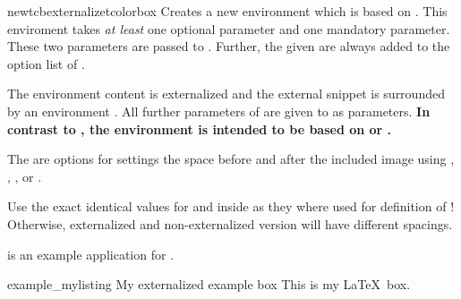 \begin{docCommand}[doc new=2015-03-11]{newtcbexternalizetcolorbox}{}
  Creates a new environment  which is based on
  . This enviroment takes \emph{at least}
  one optional parameter and one mandatory parameter.
  These two parameters are passed to .
  Further, the given  are always added to the option list of .\par
  The environment content is externalized and the external snippet is surrounded
  by an environment . All further parameters of 
  are given to  as parameters.
  \textbf{In contrast to , the
  environment  is intended to be based on 
  or .}\par
  The  are options for settings the space before
  and after the included image using , ,
  , or .
  \begin{marker}
  Use the exact identical values for  and 
  inside  as they where used for definition of
  ! Otherwise, externalized and non-externalized version will have
  different spacings.
  \end{marker}
   is an example application for .



{
\begin{dispExample}
\begin{exmyownlisting}{example_mylisting}%
  {My externalized example box}
This is my \LaTeX\ box.
\end{exmyownlisting}
\end{dispExample}
}
\end{docCommand}




